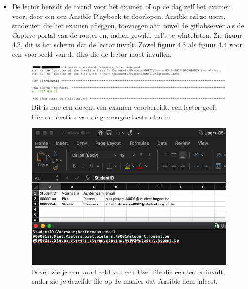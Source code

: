 \begin{itemize}
	\item De lector bereidt de avond voor het examen of op de dag zelf het examen voor, door een een Ansible Playbook te doorlopen. Ansible zal zo users, studenten die het examen afleggen, toevoegen aan zowel de gitlabserver als de Captive portal van de router en, indien gewild, url's te whitelisten. Zie figuur \hyperref[fig:PoC2]{4.2}, dit is het scherm dat de lector invult. Zowel figuur \hyperref[fig:PoC3]{4.3} als figuur \hyperref[fig:PoC4]{4.4} voor een voorbeeld van de files die de lector moet invullen. 

	\begin{figure}[H]
		\includegraphics[width=\linewidth]{img/AdminPC.png}
		\caption[Voorbeeld van het Ansible Playbook]{Dit is hoe een docent een examen voorbereidt. een lector geeft hier de locaties van de gevraagde bestanden in.}
		\label{fig:PoC2}
	\end{figure}
	
	\begin{figure}[H]
	\includegraphics[width=\linewidth]{img/CSV1.png}
	\caption[Voorbeeld van Users.csv]{Boven zie je een voorbeeld van een User file die een lector invult, onder zie je dezelfde file op de manier dat Ansible hem inleest.}
	\label{fig:PoC3}
\end{figure}


\end{itemize}
